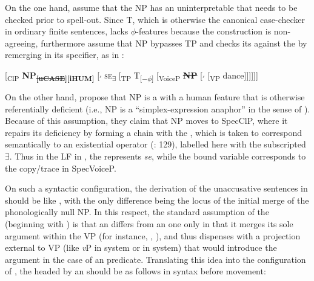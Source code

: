 \documentclass[output=paper,nonflat,newtxmath]{langsci/langscibook}
\begin{document}
\noindent On the one hand, \citet{riverosheppard2003} assume that the  NP has an uninterpretable  that needs to be checked prior to spell-out. Since T, which is otherwise the canonical case-checker in ordinary finite sentences, lacks $\phi$-features because the construction is non-agreeing, \citet{riverosheppard2003} furthermore assume that NP bypasses TP and checks its  against the  by remerging in its specifier, as in :

\begin{exe}
\ex \label{ex:lenardic: 15} {[\textsubscript{ClP} \textbf{NP}\textsubscript{\textbf{\st{[uCASE}][iHUM]}} [\textsubscript{$'$} \textsc{se}\textsubscript{\textbf{$\exists$}} [\textsubscript{TP} T\textsubscript{[$-\phi$]} [\textsubscript{VoiceP} \textbf{\st{NP}} [\textsubscript{$'$}  [\textsubscript{VP} dance]]]]]]}
\end{exe}

\noindent On the other hand, \citet{riverosheppard2003} propose that  NP is a  with a human feature that is otherwise referentially deficient (i.e., NP is a “simplex-expression anaphor” in the sense of \citealt{reinhartreuland1993}). Because of this assumption, they claim that NP moves to SpecClP, where it repairs its deficiency by forming a chain with the , which is taken to correspond semantically to an existential operator (\citealt{riverosheppard2003}: 129), labelled here with the subscripted {$\exists$}. Thus in the LF in , the  represents \textit{se}, while the bound variable corresponds to the copy/trace in SpecVoiceP.

On such a syntactic configuration, the derivation of the unaccusative sentences in  should be like , with the only difference being the locus of the initial merge of the phonologically null NP. In this respect, the standard assumption of the  (beginning with \citealt{perlmutter1978}) is that an  differs from an  one only in that it merges its sole argument within the VP (for instance, \citealt{burzio1986}, \citealt{alexiadouet2004}), and thus dispenses with a projection external to VP (like \textit{v}P in  system or  in  system) that would introduce the argument in the case of an  predicate. Translating this idea into the configuration of \citet{riverosheppard2003}, the  headed by an  should be as follows in syntax before movement:
\end{document}
